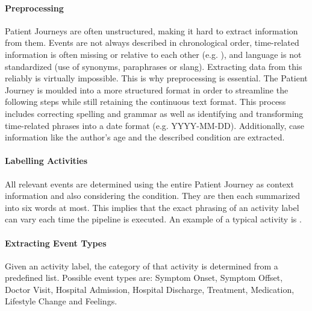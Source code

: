 \paragraph{Preprocessing} Patient Journeys are often unstructured, making it hard to extract information from them. Events are not always described in chronological order, time-related information is often missing or relative to each other (e.g. ), and language is not standardized (use of synonyms, paraphrases or slang). Extracting data from this reliably is virtually impossible. This is why preprocessing is essential. The Patient Journey is moulded into a more structured format in order to streamline the following steps while still retaining the continuous text format. This process includes correcting spelling and grammar as well as identifying and transforming time-related phrases into a date format (e.g. YYYY-MM-DD). Additionally, case information like the author's age and the described condition are extracted.
\paragraph{Labelling Activities} All relevant events are determined using the entire Patient Journey as context information and also considering the condition. They are then each summarized into six words at most. This implies that the exact phrasing of an activity label can vary each time the pipeline is executed. An example of a typical activity is .
\paragraph{Extracting Event Types} Given an activity label, the category of that activity is determined from a predefined list. Possible event types are: Symptom Onset, Symptom Offset, Doctor Visit, Hospital Admission, Hospital Discharge, Treatment, Medication, Lifestyle Change and Feelings.
